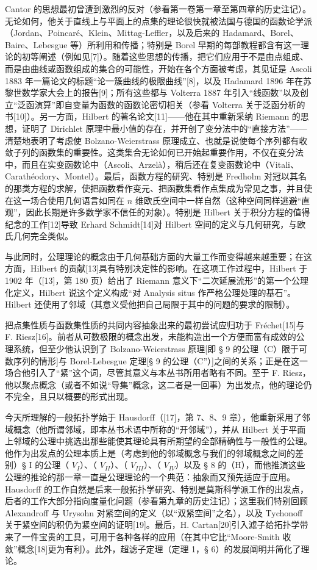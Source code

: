 Cantor 的思想最初曾遭到激烈的反对（参看第一卷第一章至第四章的历史注记）。无论如何，他关于直线上与平面上的点集的理论很快就被法国与德国的函数论学派（Jordan、Poincaré、Klein、Mittag-Leffler，以及后来的 Hadamard、Borel、Baire、Lebesgue 等）所利用和传播；特别是 Borel 早期的每部教程都含有这一理论的初等阐述（例如见{[}7{]}）。随着这些思想的传播，把它们应用于不是由点组成、而是由曲线或函数组成的集合的可能性，开始在各个方面被考虑，其见证是 Ascoli 1883 年一篇论文的标题“论一簇曲线的极限曲线”{[}8{]}，以及 Hadamard 1896 年在苏黎世数学家大会上的报告{[}9{]}；所有这些都与 Volterra 1887 年引入“线函数”以及创立“泛函演算”即自变量为函数的函数论密切相关（参看 Volterra 关于泛函分析的书{[}10{]}）。另一方面，Hilbert 的著名论文{[}11{]}——他在其中重新采纳 Riemann 的思想，证明了 Dirichlet 原理中最小值的存在，并开创了变分法中的“直接方法”——清楚地表明了考虑使 Bolzano-Weierstrass 原理成立、也就是说使每个序列都有收敛子列的函数集的重要性。这类集合无论如何已开始起重要作用，不仅在变分法中，而且在实变函数论中（Ascoli、Arzelà），稍后还在复变函数论中（Vitali、Carathéodory、Montel）。最后，函数方程的研究、特别是 Fredholm 对冠以其名的那类方程的求解，使把函数看作变元、把函数集看作点集成为常见之事，并且使在这一场合使用几何语言如同在 \(n\) 维欧氏空间中一样自然（这种空间同样逃避“直观”，因此长期是许多数学家不信任的对象）。特别是 Hilbert 关于积分方程的值得纪念的工作{[}12{]}导致 Erhard Schmidt{[}14{]}对 Hilbert 空间的定义与几何研究，与欧氏几何完全类似。

与此同时，公理理论的概念由于几何基础方面的大量工作而变得越来越重要；在这方面，Hilbert 的贡献{[}13{]}具有特别决定性的影响。在这项工作过程中，Hilbert 于 1902 年（{[}13{]}，第 180 页）给出了 Riemann 意义下“二次延展流形”的第一个公理化定义，Hilbert 说这个定义构成“对 Analysis situs 作严格公理处理的基石”。Hilbert 还使用了邻域（其意义受他把自己局限于其中的问题的要求的限制）。

把点集性质与函数集性质的共同内容抽象出来的最初尝试应归功于 Fréchet{[}15{]}与 F. Riesz{[}16{]}。前者从可数极限的概念出发，未能构造出一个方便而富有成效的公理系统，但至少他认识到了 Bolzano-Weierstrass 原理{[}即 § 9 的公理（C）限于可数序列的情形{]}与 Borel-Lebesgue 定理{[}§ 9 的公理（C''）{]}之间的关系；正是在这一场合他引入了“紧”这个词，尽管其意义与本丛书所用者略有不同。至于 F. Riesz，他以聚点概念（或者不如说“导集”概念，这二者是一回事）为出发点，他的理论仍不完全，且只以概要的形式出现。

今天所理解的一般拓扑学始于 Hausdorff（{[}17{]}，第 7、8、9 章），他重新采用了邻域概念（他所谓邻域，即本丛书术语中所称的“开邻域”），并从 Hilbert 关于平面上邻域的公理中挑选出那些能使其理论具有所期望的全部精确性与一般性的公理。他作为出发点的公理本质上是（考虑到他的邻域概念与我们的邻域概念之间的差别）§ I 的公理（ \(V_{I}\)）、（ \(V_{II}\)）、（ \(V_{III}\)）、（ \(V_{IV}\)）以及 § 8 的（H），而他推演这些公理的推论的那一章一直是公理理论的一个典范：抽象而又预先适应于应用。Hausdorff 的工作自然是后来一般拓扑学研究、特别是莫斯科学派工作的出发点，后者的工作大部分指向度量化问题（参看第九章的历史注记）；这里我们特别回顾 Alexandroff 与 Urysohn 对紧空间的定义（以“双紧空间”之名），以及 Tychonoff 关于紧空间的积仍为紧空间的证明{[}19{]}。最后，H. Cartan{[}20{]}引入滤子给拓扑学带来了一件宝贵的工具，可用于各种各样的应用（在其中它比“Moore-Smith 收敛”概念{[}18{]}更为有利）。此外，超滤子定理（定理 1，§ 6）的发展阐明并简化了理论。

